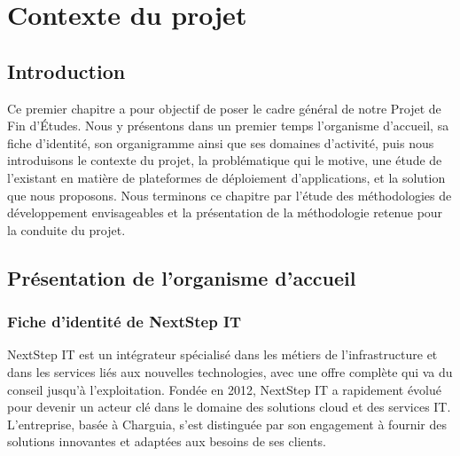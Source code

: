 \chapter{Contexte du projet}


\setcounter{chapter}{1}
\minitoc


\section{Introduction}

Ce premier chapitre a pour objectif de poser le cadre général de notre Projet de Fin d'Études. Nous y présentons dans un premier temps l'organisme d'accueil, sa fiche d'identité, son organigramme ainsi que ses domaines d'activité, puis nous introduisons le contexte du projet, la problématique qui le motive, une étude de l'existant en matière de plateformes de déploiement d'applications, et la solution que nous proposons. Nous terminons ce chapitre par l'étude des méthodologies de développement envisageables et la présentation de la méthodologie retenue pour la conduite du projet.


\section{Présentation de l'organisme d'accueil}

\subsection{Fiche d'identité de NextStep IT}

NextStep IT est un intégrateur spécialisé dans les métiers de l'infrastructure et dans les services liés aux nouvelles technologies, avec une offre complète qui va du conseil jusqu'à l'exploitation. Fondée en 2012, NextStep IT a rapidement évolué pour devenir un acteur clé dans le domaine des solutions cloud et des services IT. L'entreprise, basée à Charguia, s'est distinguée par son engagement à fournir des solutions innovantes et adaptées aux besoins de ses clients.

